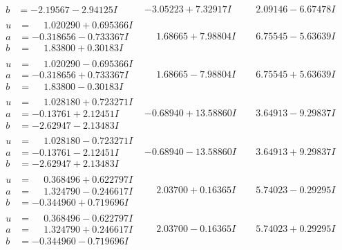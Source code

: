 \documentclass[1p]{elsarticle_modified}
\theoremstyle{definition}
\begin{document}
$$\begin{array}{c|c|c}
\begin{aligned}
b &= -2.19567 - 2.94125 I\end{aligned}
 & -3.05223 + 7.32917 I & \phantom{-}2.09146 - 6.67478 I \\ \hline\begin{aligned}
u &= \phantom{-}1.020290 + 0.695366 I \\
a &= -0.318656 - 0.733367 I \\
b &= \phantom{-}1.83800 + 0.30183 I\end{aligned}
 & \phantom{-}1.68665 + 7.98804 I & \phantom{-}6.75545 - 5.63639 I \\ \hline\begin{aligned}
u &= \phantom{-}1.020290 - 0.695366 I \\
a &= -0.318656 + 0.733367 I \\
b &= \phantom{-}1.83800 - 0.30183 I\end{aligned}
 & \phantom{-}1.68665 - 7.98804 I & \phantom{-}6.75545 + 5.63639 I \\ \hline\begin{aligned}
u &= \phantom{-}1.028180 + 0.723271 I \\
a &= -0.13761 + 2.12451 I \\
b &= -2.62947 - 2.13483 I\end{aligned}
 & -0.68940 + 13.58860 I & \phantom{-}3.64913 - 9.29837 I \\ \hline\begin{aligned}
u &= \phantom{-}1.028180 - 0.723271 I \\
a &= -0.13761 - 2.12451 I \\
b &= -2.62947 + 2.13483 I\end{aligned}
 & -0.68940 - 13.58860 I & \phantom{-}3.64913 + 9.29837 I \\ \hline\begin{aligned}
u &= \phantom{-}0.368496 + 0.622797 I \\
a &= \phantom{-}1.324790 - 0.246617 I \\
b &= -0.344960 + 0.719696 I\end{aligned}
 & \phantom{-}2.03700 + 0.16365 I & \phantom{-}5.74023 - 0.29295 I \\ \hline\begin{aligned}
u &= \phantom{-}0.368496 - 0.622797 I \\
a &= \phantom{-}1.324790 + 0.246617 I \\
b &= -0.344960 - 0.719696 I\end{aligned}
 & \phantom{-}2.03700 - 0.16365 I & \phantom{-}5.74023 + 0.29295 I \\ \hline\begin{aligned}

\end{aligned}
\end{array}$$
\end{document}
